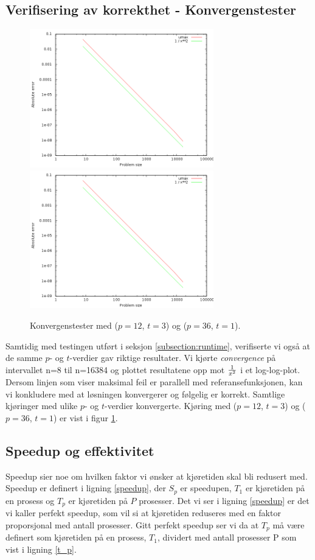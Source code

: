 \documentclass{article}
\begin{document}
\subsection{Verifisering av korrekthet - Konvergenstester}
\begin{figure}[t]
	\centering
	\includegraphics[width=8cm]{img/convergence.png}	
	\includegraphics[width=8cm]{img/convergence.png}	
	\caption{Konvergenstester med ($p=12$, $t=3$) og ($p=36$, $t=1$).}
	\label{fig:convergence}
	
\end{figure}

Samtidig med testingen utført i seksjon \ref{subsection:runtime}, verifiserte vi også at de samme $p$- og $t$-verdier gav riktige resultater. Vi kjørte \emph{convergence} på intervallet n=8 til n=16384 og plottet resultatene opp mot ${1 \over x^2}$ i et log-log-plot. Dersom linjen som viser maksimal feil er parallell med referansefunksjonen, kan vi konkludere med at løsningen konvergerer og følgelig er korrekt. Samtlige kjøringer med ulike $p$- og $t$-verdier konvergerte. Kjøring med ($p=12$, $t=3$) og ($p=36$, $t=1$) er vist i figur \ref{fig:convergence}.

\subsection{Speedup og effektivitet}
\label{subsection:speedup_efficiency}
Speedup sier noe om hvilken faktor vi ønsker at kjøretiden skal bli redusert med. Speedup er definert i ligning \ref{speedup}, der $S_p$ er speedupen, $T_1$ er kjøretiden på en prosess og $T_p$ er kjøretiden på $P$ prosesser. Det vi ser i ligning \ref{speedup} er det vi kaller perfekt speedup, som vil si at kjøretiden reduseres med en faktor proporsjonal med antall prosesser. Gitt perfekt speedup ser vi da at $T_p$ må være definert som kjøretiden på en prosess, $T_1$, dividert med antall prosesser P som vist i ligning \ref{t_p}.  
\end{document}
